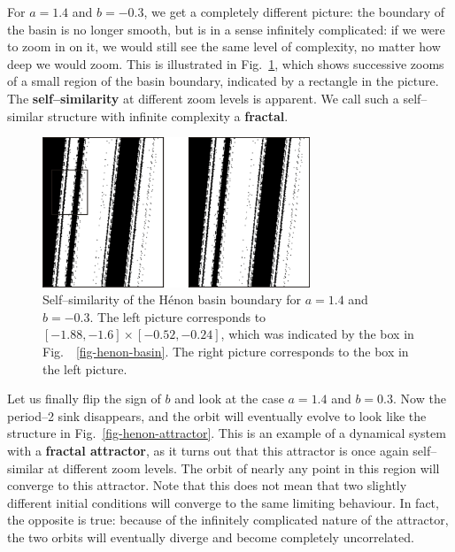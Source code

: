 For $a=1.4$ and $b=-0.3$, we get a completely different picture: the boundary of the basin is no longer smooth, but is in a sense infinitely complicated: if we were to zoom in on it, we would still see the same level of complexity, no matter how deep we would zoom. This is illustrated in Fig.~\ref{fig-henon-zoom}, which shows successive zooms of a small region of the basin boundary, indicated by a rectangle in the picture. The \textbf{self--similarity} at different zoom levels is apparent. We call such a self--similar structure with infinite complexity a \textbf{fractal}.

\begin{figure}
\centering
\includegraphics[width=8cm]{dynamic/figures/henon_zoom}
\caption{Self--similarity of the H\'{e}non basin boundary for $a=1.4$ and $b=-0.3$. The left picture corresponds to $[-1.88,-1.6] \times [-0.52,-0.24]$, which was indicated by the box in Fig.~~\ref{fig-henon-basin}. The right picture corresponds to the box in the left picture.}
\label{fig-henon-zoom}
\end{figure} 

Let us finally flip the sign of $b$ and look at the case $a=1.4$ and $b=0.3$. Now the period--2 sink disappears, and the orbit will eventually evolve to look like the structure in Fig.~\ref{fig-henon-attractor}. This is an example of a dynamical system with a \textbf{fractal attractor}, as it turns out that this attractor is once again self--similar at different zoom levels. The orbit of nearly any point in this region will converge to this attractor. Note that this does not mean that two slightly different initial conditions will converge to the same limiting behaviour. In fact, the opposite is true: because of the infinitely complicated nature of the attractor, the two orbits will eventually diverge and become completely uncorrelated.

